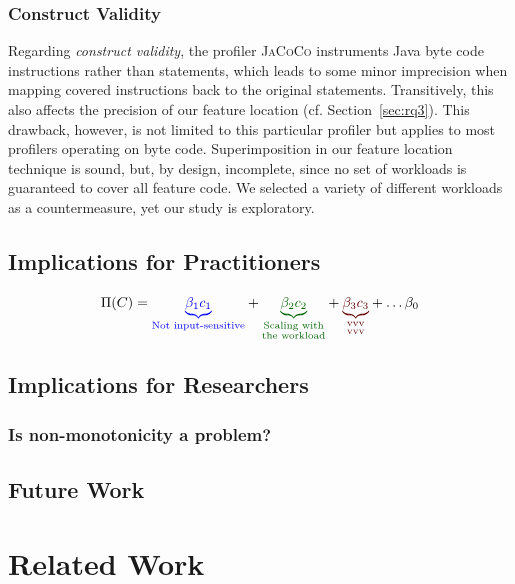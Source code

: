 {\subsubsection{Construct Validity}\label{sec:construct_validity}
Regarding \emph{construct validity}, the profiler \textsc{JaCoCo} instruments Java byte code instructions rather than statements, which leads to some minor imprecision when mapping covered instructions back to the original statements. Transitively, this also affects the precision of our feature location (cf. Section~\ref{sec:rq3}). This drawback, however, is not limited to this particular profiler but applies to most profilers operating on byte code. 
Superimposition in our feature location technique is sound, but, by design, incomplete, since no set of workloads is guaranteed to cover all feature code. We selected a variety of different workloads as a countermeasure, yet our study is exploratory. 

\subsection{Implications for Practitioners}

\begin{equation}
	\Pi(C) = {\color{blue}\underbrace{\beta_1 c_1}_{\text{Not input-sensitive}}} + {\color{green!40!black}\underbrace{\beta_2 c_2}_{\substack{\text{Scaling with}\\ \text{the workload}}} } + {\color{red!40!black}\underbrace{\beta_3 c_3}_{
			\substack{\text{vvv}\\\text{vvv}}	
	}} +\ldots \beta_0
\end{equation}

\subsection{Implications for Researchers}

\subsubsection{Is non-monotonicity a problem?}

\subsection{Future Work}
\section{Related Work}\label{sec:related}
}
